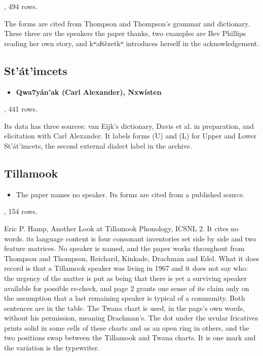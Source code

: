 \cite{src:Hall-Luntzlara-Mellesmoen-and-Reid-2026}, 494 rows.

The forms are cited from Thompson and Thompson's grammar and dictionary. These three are the speakers the paper thanks, two examples are Bev Phillips reading her own story, and kʷaɬtèzetkʷ introduces herself in the acknowledgement.

\subsection{St'át'imcets}

\begin{itemize}
\item \textbf{Qwa7yán'ak (Carl Alexander), Nxwísten}
\end{itemize}

\cite{src:Davis-and-Mellesmoen-2023}, 441 rows.

Its data has three sources: van Eijk's dictionary, Davis et al. in preparation, and elicitation with Carl Alexander. It labels forms (U) and (L) for Upper and Lower St'át'imcets, the second external dialect label in the archive.

\subsection{Tillamook}

\begin{itemize}
\item The paper names no speaker. Its forms are cited from a published source.
\end{itemize}

\cite{src:Hamp-1967}, 154 rows.

Eric P. Hamp, Another Look at Tillamook Phonology, ICSNL 2. It cites no words. its language content is four consonant inventories set side by side and two feature matrices. No speaker is named, and the paper works throughout from Thompson and Thompson, Reichard, Kinkade, Drachman and Edel. What it does record is that a Tillamook speaker was living in 1967 and it does not say who: the urgency of the matter is put as being that there is yet a surviving speaker available for possible re-check, and page 2 grants one sense of its claim only on the assumption that a last remaining speaker is typical of a community. Both sentences are in the table. The Twana chart is used, in the page's own words, without his permission, meaning Drachman's. The dot under the uvular fricatives prints solid in some cells of these charts and as an open ring in others, and the two positions swap between the Tillamook and Twana charts. It is one mark and the variation is the typewriter.

